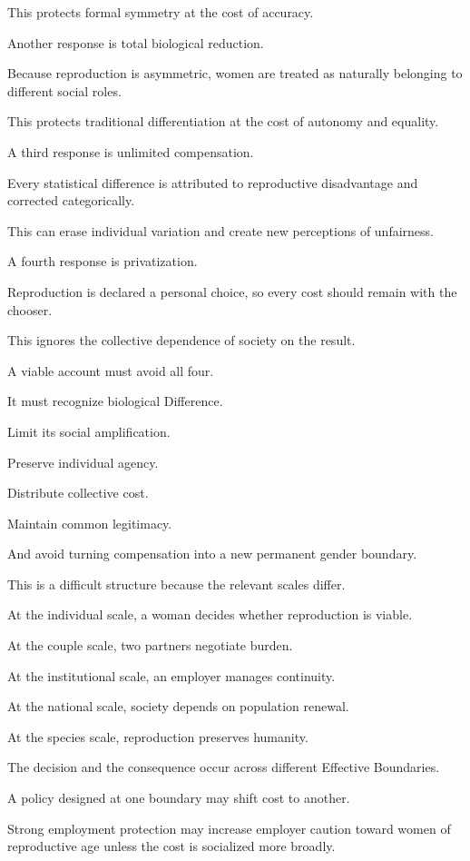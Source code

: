 This protects formal symmetry at the cost of accuracy.

Another response is total biological reduction.

Because reproduction is asymmetric, women are treated as naturally belonging to different social roles.

This protects traditional differentiation at the cost of autonomy and equality.

A third response is unlimited compensation.

Every statistical difference is attributed to reproductive disadvantage and corrected categorically.

This can erase individual variation and create new perceptions of unfairness.

A fourth response is privatization.

Reproduction is declared a personal choice, so every cost should remain with the chooser.

This ignores the collective dependence of society on the result.

A viable account must avoid all four.

It must recognize biological Difference.

Limit its social amplification.

Preserve individual agency.

Distribute collective cost.

Maintain common legitimacy.

And avoid turning compensation into a new permanent gender boundary.

This is a difficult structure because the relevant scales differ.

At the individual scale, a woman decides whether reproduction is viable.

At the couple scale, two partners negotiate burden.

At the institutional scale, an employer manages continuity.

At the national scale, society depends on population renewal.

At the species scale, reproduction preserves humanity.

The decision and the consequence occur across different Effective Boundaries.

A policy designed at one boundary may shift cost to another.

Strong employment protection may increase employer caution toward women of reproductive age unless the cost is socialized more broadly.

